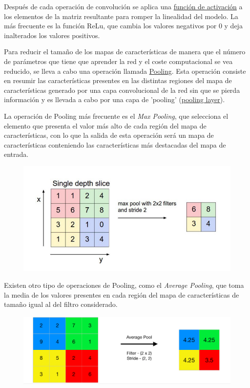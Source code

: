\documentclass[a4paper,11pt]{article}
\begin{document}
Después de cada operación de convolución se aplica una \underline{función de activación} a los elementos de la matriz resultante para romper la linealidad del modelo. La más frecuente es la función ReLu, que cambia los valores negativos por 0 y deja inalterados los valores positivos.

Para reducir el tamaño de los mapas de características de manera que el número de parámetros que tiene que aprender la red y el coste computacional se vea reducido, se lleva a cabo una operación llamada \underline{Pooling}. Esta operación consiste en resumir las características presentes en las distintas regiones del mapa de características generado por una capa convolucional de la red sin que se pierda información y es llevada a cabo por una capa de 'pooling' (\underline{pooling layer}).

La operación de Pooling más frecuente es el \textit{Max Pooling}, que selecciona el elemento que presenta el valor más alto de cada región del mapa de características, con lo que la salida de esta  operación será un mapa de características conteniendo las características más destacadas del mapa de entrada. 

\begin{figure}[H]
	\centering
	\includegraphics[width=0.8\linewidth]{img/cov5}
	\caption{}
	\label{fig:cov5}
\end{figure}


Existen otro tipo de operaciones de Pooling, como el \textit{Average Pooling}, que toma la media de los valores presentes en cada región del mapa de características de tamaño igual al del filtro considerado. 

\begin{figure}[H]
	\centering
	\includegraphics[width=0.8\linewidth]{img/conv9}
	\caption{}
	\label{fig:conv9}
\end{figure}
\end{document}

